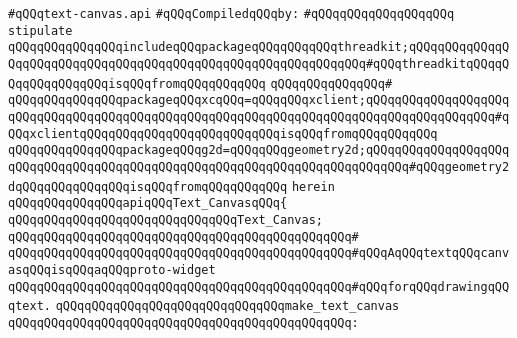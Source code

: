 \label{src/lib/x-kit/widget/old/fancy/graphviz/text/text-canvas.api}
\verb|#qQQqtext-canvas.api|\newline
\newline
\verb|#qQQqCompiledqQQqby:|\newline
\verb|#qQQqqQQqqQQqqQQqqQQq|\newline
\newline
\verb|stipulate|\newline
\verb|qQQqqQQqqQQqqQQqincludeqQQqpackageqQQqqQQqqQQqthreadkit;qQQqqQQqqQQqqQQqqQQqqQQqqQQqqQQqqQQqqQQqqQQqqQQqqQQqqQQqqQQqqQQq#qQQqthreadkitqQQqqQQqqQQqqQQqqQQqisqQQqfromqQQqqQQqqQQq|\newline
\verb|qQQqqQQqqQQqqQQq#|\newline
\verb|qQQqqQQqqQQqqQQqpackageqQQqxcqQQq=qQQqqQQqxclient;qQQqqQQqqQQqqQQqqQQqqQQqqQQqqQQqqQQqqQQqqQQqqQQqqQQqqQQqqQQqqQQqqQQqqQQqqQQqqQQqqQQqqQQq#qQQqxclientqQQqqQQqqQQqqQQqqQQqqQQqqQQqisqQQqfromqQQqqQQqqQQq|\newline
\verb|qQQqqQQqqQQqqQQqpackageqQQqg2d=qQQqqQQqgeometry2d;qQQqqQQqqQQqqQQqqQQqqQQqqQQqqQQqqQQqqQQqqQQqqQQqqQQqqQQqqQQqqQQqqQQqqQQqqQQq#qQQqgeometry2dqQQqqQQqqQQqqQQqisqQQqfromqQQqqQQqqQQq|\newline
\verb|herein|\newline
\newline
\verb|qQQqqQQqqQQqqQQqapiqQQqText_CanvasqQQq{|\newline
\newline
\verb|qQQqqQQqqQQqqQQqqQQqqQQqqQQqqQQqText_Canvas;|\newline
\verb|qQQqqQQqqQQqqQQqqQQqqQQqqQQqqQQqqQQqqQQqqQQqqQQq#|\newline
\verb|qQQqqQQqqQQqqQQqqQQqqQQqqQQqqQQqqQQqqQQqqQQqqQQq#qQQqAqQQqtextqQQqcanvasqQQqisqQQqaqQQqproto-widget|\newline
\verb|qQQqqQQqqQQqqQQqqQQqqQQqqQQqqQQqqQQqqQQqqQQqqQQq#qQQqforqQQqdrawingqQQqtext.|\newline
\newline
\verb|qQQqqQQqqQQqqQQqqQQqqQQqqQQqqQQqmake_text_canvas|\newline
\verb|qQQqqQQqqQQqqQQqqQQqqQQqqQQqqQQqqQQqqQQqqQQqqQQq:|\newline
